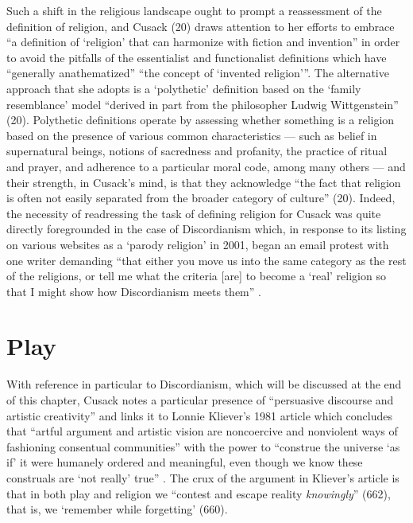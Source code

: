\documentclass[Draft.tex]{subfiles}
\begin{document}
Such a shift in the religious landscape ought to prompt a reassessment of
the definition of religion, and Cusack (20) draws attention to her efforts to
embrace ``a definition of `religion' that can
harmonize with fiction and invention'' in order to avoid the pitfalls
of the essentialist and functionalist definitions
which have ``generally anathematized'' ``the concept of `invented religion'''.
The alternative approach that she adopts is a `polythetic' definition
based on the `family resemblance' model ``derived in part from the philosopher
Ludwig Wittgenstein'' (20).
Polythetic definitions operate by assessing whether something is a religion
based on the presence of various common characteristics --- such as
belief in supernatural beings, notions of sacredness and profanity,
the practice of ritual and prayer, and adherence to a particular moral code,
among many others --- and their strength, in Cusack's mind, is that
they acknowledge ``the fact that religion is often not easily separated from
the broader category of culture'' (20).
Indeed, the necessity of readressing the task of defining religion for Cusack
was quite directly foregrounded in the case of Discordianism which,
in response to its listing on various websites as a `parody religion'
in 2001, began an email protest with one writer demanding
``that either you move us into the same category
as the rest of the religions, or tell me what the criteria [are]
to become a `real' religion so that I might show
how Discordianism meets them'' \parencite[209]{Chidester05}.


\section*{Play}
With reference in particular to Discordianism,
which will be discussed at the end of this chapter,
Cusack \parencite*[23]{Cusack10} notes a particular presence of
``persuasive discourse and artistic creativity'' and links it to
Lonnie Kliever's 1981 article which concludes that
``artful argument and artistic vision are noncoercive and nonviolent ways
of fashioning consentual communities'' with the power to
``construe the universe `as if' it were humanely ordered and meaningful,
even though we know these construals are
`not really' true'' \parencite[665]{Kliever81}.
The crux of the argument in Kliever's article is that
in both play and religion we
``contest and escape reality \textit{knowingly}'' (662),
that is, we `remember while forgetting' (660).
\end{document}
